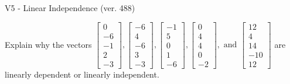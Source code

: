\begin{exercise}
  \begin{exerciseTitle}V5 - Linear Independence (ver. 488)\end{exerciseTitle}
  \begin{exerciseStatement}
    Explain why the vectors \(\left[\begin{array}{r}
0 \\
-6 \\
-1 \\
2 \\
-3
\end{array}\right] , \left[\begin{array}{r}
-6 \\
4 \\
-6 \\
3 \\
-3
\end{array}\right] , \left[\begin{array}{r}
-1 \\
5 \\
0 \\
1 \\
-6
\end{array}\right] , \left[\begin{array}{r}
0 \\
4 \\
4 \\
0 \\
-2
\end{array}\right] , \text{ and } \left[\begin{array}{r}
12 \\
4 \\
14 \\
-10 \\
12
\end{array}\right]\) are linearly dependent or linearly independent.	



\end{exerciseStatement}
\end{exercise}
